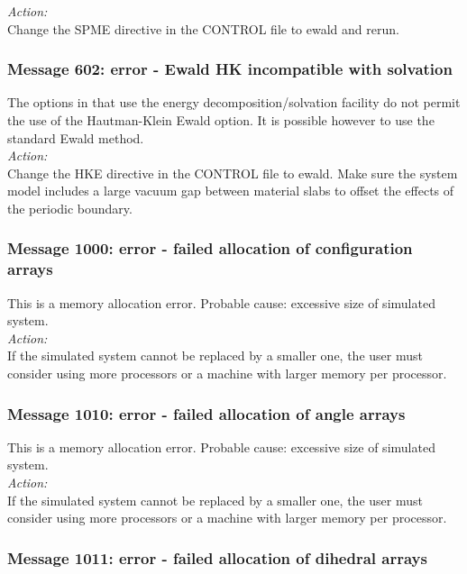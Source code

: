 \noindent
{\em Action:}\\
Change the SPME directive in the CONTROL file to ewald and rerun.

\subsubsection*{Message 602: error - Ewald HK incompatible with solvation}

The options in \D{} that use the energy decomposition/solvation facility do not
permit the use of the Hautman-Klein Ewald option. It is possible however to
use the standard Ewald method.\\

\noindent
{\em Action:}\\
Change the HKE directive in the CONTROL file to ewald. Make sure the system
model includes a large vacuum gap between material slabs  to offset the
effects of the periodic boundary.

\subsubsection*{Message 1000: error - failed allocation of
configuration arrays}

This is a memory allocation error. Probable cause: excessive size of
simulated system. \\

\noindent
{\em Action:}\\
If the simulated system cannot be replaced by a smaller one, the user
must consider using more processors or a machine with larger memory
per processor.

\subsubsection*{Message 1010: error - failed allocation of angle
arrays}

This is a memory allocation error. Probable cause: excessive size of
simulated system. \\

\noindent
{\em Action:}\\
If the simulated system cannot be replaced by a smaller one, the user
must consider using more processors or a machine with larger memory
per processor.

\subsubsection*{Message 1011: error - failed allocation of dihedral
arrays}


